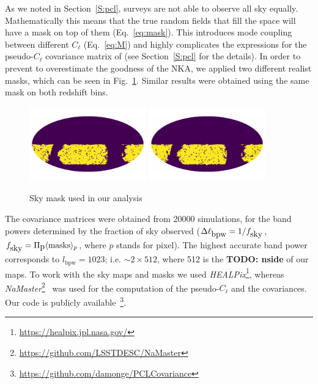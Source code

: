 \documentclass[a4paper,11pt]{article}
\newcommand{\todo}[1]{{\bf TODO: #1}}
\newcommand{\fsky}{f_{\mbox{\rm sky}}}
\newcommand{\cl}{C_\ell}
\newcommand{\lbpw}{\ell_{\mbox{bpw}}}
\newcommand{\fsky}{f_{\mbox{sky}}}
\begin{document}
As we noted in Section~\ref{S:pcl}, surveys are not able to observe all sky
equally. Mathematically this means that the true random fields that fill the
space will have a mask on top of them (Eq.~\ref{eq:mask}). This introduces
mode coupling between different $\cl$ (Eq.~\ref{eq:M}) and highly complicates
the expressions for the pseudo-$\cl$ covariance matrix of (see
Section~\ref{S:pcl} for the details). In order to prevent to overestimate the
goodness of the NKA, we applied two different realist masks, which can be seen
in Fig.~\ref{fig:mask}. Similar results were obtained using the same mask on
both redshift bins.

\begin{figure}
  \centering
  \includegraphics[width=0.45\textwidth]{./figures/mask-lss1.pdf}
  \includegraphics[width=0.45\textwidth]{./figures/mask-lss2.pdf}
  \caption{Sky mask used in our analysis}
  \label{fig:mask}
\end{figure}

The covariance matrices were obtained from 20000 simulations, for the band
powers determined by the fraction of sky observed ($\Delta \lbpw = 1/\fsky$,
$\fsky = \Pi_{\mbox{p}} \langle \mbox{masks} \rangle_{p}$, where $p$ stands
for pixel). The highest accurate band power corresponds to $l_{\mbox{bpw}} =
1023$; i.e. $\sim 2 \times 512$, where 512 is the \todo{nside} of our maps. To
work with the sky maps and masks we used
\textit{HEALPix}\footnote{\url{https://healpix.jpl.nasa.gov/}}, whereas
\textit{NaMaster}\footnote{\url{https://github.com/LSSTDESC/NaMaster}}~\cite{2018arXiv180909603A}
was used for the computation of the pseudo-$\cl$ and the covariances. Our code
is publicly
available~\footnote{\url{https://github.com/damonge/PCLCovariance}}.
\end{document}
